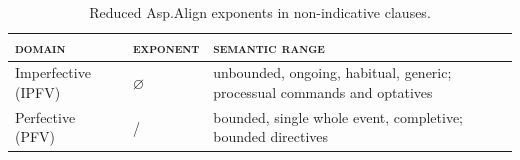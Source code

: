 \begin{table}
  \footnotesize
  \caption{Reduced Asp.Align exponents in non-indicative clauses.}
  \ifparadigmappendix\else\label{tab:reduced-asp}\fi
  \begin{tabularx}{0.9\textwidth}{l l L}
    \toprule
    \textsc{domain} & \textsc{exponent} & \textsc{semantic range} \\
    \midrule
    Imperfective (IPFV) & $\varnothing$ & unbounded, ongoing, habitual, generic;
                                        processual commands and optatives \\
    Perfective (PFV)    & / & bounded, single whole event, completive;
                                        bounded directives \\
    \bottomrule
  \end{tabularx}
\end{table}
